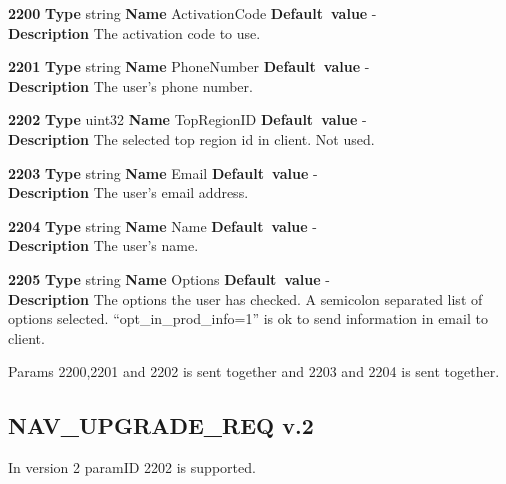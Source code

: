 \documentclass[a4paper]{article}
\begin{document}
\begin{list}{\textbf{ParamID}}{}
\item \textbf{2200} \textbf{Type} string \textbf{Name} ActivationCode
                 \textbf{Default~value} - \\
  \label{ActivationCode}
  \textbf{Description} The activation code to use.
\item \textbf{2201} \textbf{Type} string \textbf{Name} PhoneNumber
                 \textbf{Default~value} - \\
  \label{PhoneNumber}
  \textbf{Description} The user's phone number.
\item \textbf{2202} \textbf{Type} uint32 \textbf{Name} TopRegionID
                 \textbf{Default~value} - \\
  \label{upgrade_req:TopRegionID}
  \textbf{Description} The selected top region id in client. Not used.
\item \textbf{2203} \textbf{Type} string \textbf{Name} Email
                 \textbf{Default~value} - \\
  \label{Email}
  \textbf{Description} The user's email address.
\item \textbf{2204} \textbf{Type} string \textbf{Name} Name
                 \textbf{Default~value} - \\
  \label{Name}
  \textbf{Description} The user's name.
\item \textbf{2205} \textbf{Type} string \textbf{Name} Options
                 \textbf{Default~value} - \\
  \label{Options}
  \textbf{Description} The options the user has checked. A semicolon 
  separated list of options selected. ``opt\_in\_prod\_info=1'' is ok to 
  send information in email to client.
\end{list}

Params 2200,2201 and 2202 is sent together and 2203 and 2204 is sent together.

\subsection{NAV\_UPGRADE\_REQ v.2}

In version 2 paramID 2202 is supported.
\end{document}
